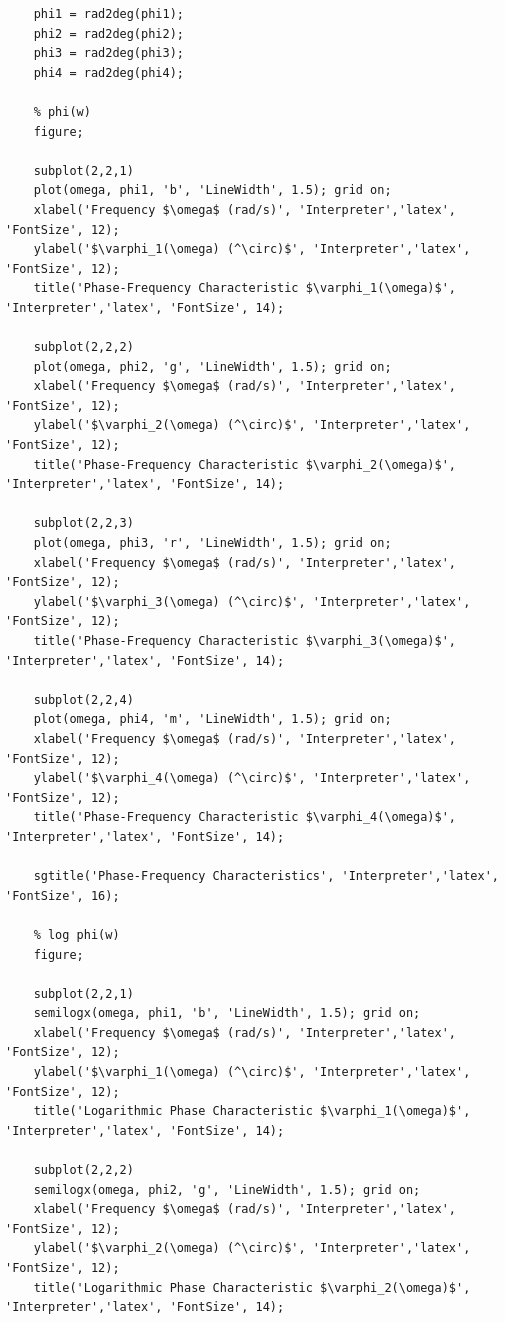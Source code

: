 \documentclass[a4paper, 12pt]{article}
\begin{document}
\begin{lstlisting}[label=task1, caption={Программа для задания 1}]
    % rad to deg
    phi1 = rad2deg(phi1);
    phi2 = rad2deg(phi2);
    phi3 = rad2deg(phi3);
    phi4 = rad2deg(phi4);

    % phi(w)
    figure;

    subplot(2,2,1)
    plot(omega, phi1, 'b', 'LineWidth', 1.5); grid on;
    xlabel('Frequency $\omega$ (rad/s)', 'Interpreter','latex', 'FontSize', 12);
    ylabel('$\varphi_1(\omega) (^\circ)$', 'Interpreter','latex', 'FontSize', 12);
    title('Phase-Frequency Characteristic $\varphi_1(\omega)$', 'Interpreter','latex', 'FontSize', 14);

    subplot(2,2,2)
    plot(omega, phi2, 'g', 'LineWidth', 1.5); grid on;
    xlabel('Frequency $\omega$ (rad/s)', 'Interpreter','latex', 'FontSize', 12);
    ylabel('$\varphi_2(\omega) (^\circ)$', 'Interpreter','latex', 'FontSize', 12);
    title('Phase-Frequency Characteristic $\varphi_2(\omega)$', 'Interpreter','latex', 'FontSize', 14);

    subplot(2,2,3)
    plot(omega, phi3, 'r', 'LineWidth', 1.5); grid on;
    xlabel('Frequency $\omega$ (rad/s)', 'Interpreter','latex', 'FontSize', 12);
    ylabel('$\varphi_3(\omega) (^\circ)$', 'Interpreter','latex', 'FontSize', 12);
    title('Phase-Frequency Characteristic $\varphi_3(\omega)$', 'Interpreter','latex', 'FontSize', 14);

    subplot(2,2,4)
    plot(omega, phi4, 'm', 'LineWidth', 1.5); grid on;
    xlabel('Frequency $\omega$ (rad/s)', 'Interpreter','latex', 'FontSize', 12);
    ylabel('$\varphi_4(\omega) (^\circ)$', 'Interpreter','latex', 'FontSize', 12);
    title('Phase-Frequency Characteristic $\varphi_4(\omega)$', 'Interpreter','latex', 'FontSize', 14);

    sgtitle('Phase-Frequency Characteristics', 'Interpreter','latex', 'FontSize', 16);

    % log phi(w)
    figure;

    subplot(2,2,1)
    semilogx(omega, phi1, 'b', 'LineWidth', 1.5); grid on;
    xlabel('Frequency $\omega$ (rad/s)', 'Interpreter','latex', 'FontSize', 12);
    ylabel('$\varphi_1(\omega) (^\circ)$', 'Interpreter','latex', 'FontSize', 12);
    title('Logarithmic Phase Characteristic $\varphi_1(\omega)$', 'Interpreter','latex', 'FontSize', 14);

    subplot(2,2,2)
    semilogx(omega, phi2, 'g', 'LineWidth', 1.5); grid on;
    xlabel('Frequency $\omega$ (rad/s)', 'Interpreter','latex', 'FontSize', 12);
    ylabel('$\varphi_2(\omega) (^\circ)$', 'Interpreter','latex', 'FontSize', 12);
    title('Logarithmic Phase Characteristic $\varphi_2(\omega)$', 'Interpreter','latex', 'FontSize', 14);


\end{lstlisting}
\end{document}
